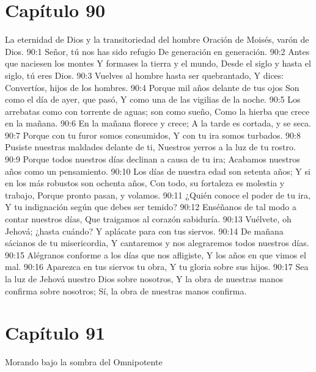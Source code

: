 \section*{Capítulo 90}
La eternidad de Dios y la transitoriedad del hombre 
Oración de Moisés, varón de Dios. 
90:1 Señor, tú nos has sido refugio 
De generación en generación. 
90:2 Antes que naciesen los montes 
Y formases la tierra y el mundo, 
Desde el siglo y hasta el siglo, tú eres Dios. 
90:3 Vuelves al hombre hasta ser quebrantado, 
Y dices: Convertíos, hijos de los hombres. 
90:4 Porque mil años delante de tus ojos 
Son como el día de ayer, que pasó, 
Y como una de las vigilias de la noche. 
90:5 Los arrebatas como con torrente de aguas; son como sueño, 
Como la hierba que crece en la mañana. 
90:6 En la mañana florece y crece; 
A la tarde es cortada, y se seca. 
90:7 Porque con tu furor somos consumidos, 
Y con tu ira somos turbados. 
90:8 Pusiste nuestras maldades delante de ti, 
Nuestros yerros a la luz de tu rostro. 
90:9 Porque todos nuestros días declinan a causa de tu ira; 
Acabamos nuestros años como un pensamiento. 
90:10 Los días de nuestra edad son setenta años; 
Y si en los más robustos son ochenta años, 
Con todo, su fortaleza es molestia y trabajo, 
Porque pronto pasan, y volamos. 
90:11 ¿Quién conoce el poder de tu ira, 
Y tu indignación según que debes ser temido? 
90:12 Enséñanos de tal modo a contar nuestros días, 
Que traigamos al corazón sabiduría. 
90:13 Vuélvete, oh Jehová; ¿hasta cuándo? 
Y aplácate para con tus siervos. 
90:14 De mañana sácianos de tu misericordia, 
Y cantaremos y nos alegraremos todos nuestros días. 
90:15 Alégranos conforme a los días que nos afligiste, 
Y los años en que vimos el mal. 
90:16 Aparezca en tus siervos tu obra, 
Y tu gloria sobre sus hijos. 
90:17 Sea la luz de Jehová nuestro Dios sobre nosotros, 
Y la obra de nuestras manos confirma sobre nosotros; 
Sí, la obra de nuestras manos confirma. 
\section*{Capítulo 91}
Morando bajo la sombra del Omnipotente 
 
